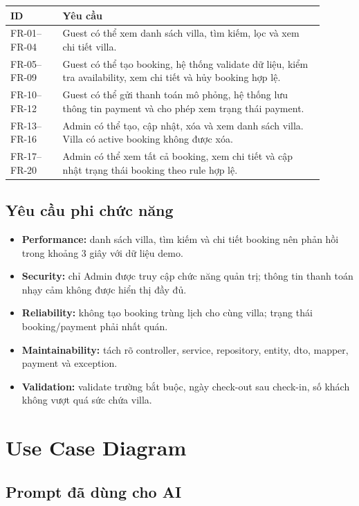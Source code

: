 \documentclass[12pt,a4paper]{article}
\begin{document}
\begin{longtable}{|p{0.15\linewidth}|p{0.75\linewidth}|}
\hline
\textbf{ID} & \textbf{Yêu cầu} \\
\hline
FR-01--FR-04 & Guest có thể xem danh sách villa, tìm kiếm, lọc và xem chi tiết villa. \\
\hline
FR-05--FR-09 & Guest có thể tạo booking, hệ thống validate dữ liệu, kiểm tra availability, xem chi tiết và hủy booking hợp lệ. \\
\hline
FR-10--FR-12 & Guest có thể gửi thanh toán mô phỏng, hệ thống lưu thông tin payment và cho phép xem trạng thái payment. \\
\hline
FR-13--FR-16 & Admin có thể tạo, cập nhật, xóa và xem danh sách villa. Villa có active booking không được xóa. \\
\hline
FR-17--FR-20 & Admin có thể xem tất cả booking, xem chi tiết và cập nhật trạng thái booking theo rule hợp lệ. \\
\hline
\end{longtable}

\subsection{Yêu cầu phi chức năng}

\begin{itemize}[noitemsep]
  \item \textbf{Performance:} danh sách villa, tìm kiếm và chi tiết booking nên phản hồi trong khoảng 3 giây với dữ liệu demo.
  \item \textbf{Security:} chỉ Admin được truy cập chức năng quản trị; thông tin thanh toán nhạy cảm không được hiển thị đầy đủ.
  \item \textbf{Reliability:} không tạo booking trùng lịch cho cùng villa; trạng thái booking/payment phải nhất quán.
  \item \textbf{Maintainability:} tách rõ controller, service, repository, entity, dto, mapper, payment và exception.
  \item \textbf{Validation:} validate trường bắt buộc, ngày check-out sau check-in, số khách không vượt quá sức chứa villa.
\end{itemize}

\section{Use Case Diagram}

\subsection{Prompt đã dùng cho AI}
\end{document}
